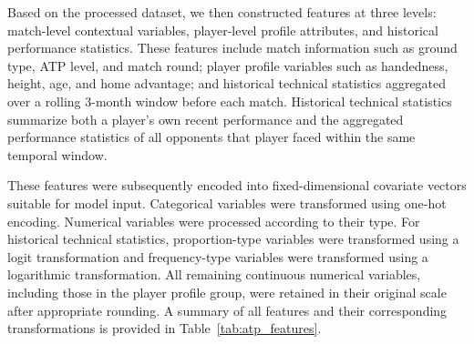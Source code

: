 \documentclass[
  12pt]{article}
\begin{document}
Based on the processed dataset, we then constructed features at three levels: match-level contextual variables, player-level profile attributes, and historical performance statistics. These features include match information such as ground type, ATP level, and match round; player profile variables such as handedness, height, age, and home advantage; and historical technical statistics aggregated over a rolling 3-month window before each match. Historical technical statistics summarize both a player's own recent performance and the aggregated performance statistics of all opponents that player faced within the same temporal window.

These features were subsequently encoded into fixed-dimensional covariate vectors suitable for model input. Categorical variables were transformed using one-hot encoding. Numerical variables were processed according to their type.
For historical technical statistics, proportion-type variables were transformed using a logit transformation and frequency-type variables were transformed using a logarithmic transformation. All remaining continuous numerical variables, including those in the player profile group, were retained in their original scale after appropriate rounding. A summary of all features and their corresponding transformations is provided in Table~\ref{tab:atp_features}. 
\end{document}
